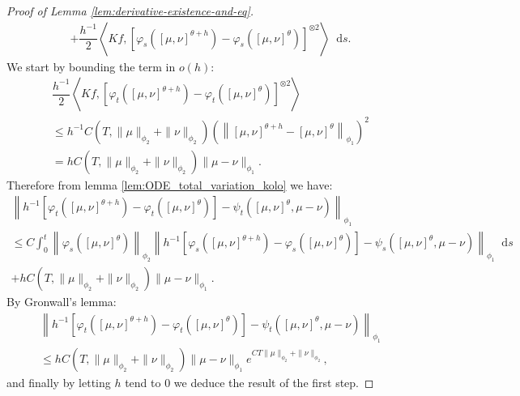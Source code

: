 \documentclass[11pt,a4paper]{article}
\newcommand{\brac}[1]{\left\langle#1\right\rangle}
\newcommand{\dd}{\mathop{}\!\mathrm{d}}
\begin{document}
\begin{proof}[Proof of Lemma \ref{lem:derivative-existence-and-eq}]
\begin{multline*}
        + \dfrac{h^{-1}}{2}\brac{Kf, \left[\varphi_s\left(\left[\mu,\nu \right]^{\theta+h} \right) - \varphi_s\left(\left[\mu,\nu \right]^{\theta} \right)\right]^{\otimes 2}} \dd s.
    \end{multline*}
    We start by bounding the term in $o(h)$:
    \begin{multline*}
        \dfrac{h^{-1}}{2}\brac{Kf, \left[\varphi_t\left(\left[\mu,\nu \right]^{\theta+h} \right) - \varphi_t\left(\left[\mu,\nu \right]^{\theta} \right)\right]^{\otimes 2}} \\
        \leq h^{-1}C\left(T,\|\mu\|_{\phi_2} + \|\nu\|_{\phi_2}\right)\left(\left\| \left[\mu,\nu \right]^{\theta+h} - \left[\mu,\nu \right]^{\theta}\right\|_{\phi_1}\right)^2\\
        = hC\left(T,\|\mu\|_{\phi_2} + \|\nu\|_{\phi_2}\right)\|\mu - \nu\|_{\phi_1}.
    \end{multline*}
    Therefore from lemma \ref{lem:ODE_total_variation_kolo} we have:
    \begin{multline*}
        \left\| h^{-1}\left[\varphi_t\left(\left[\mu,\nu \right]^{\theta+h} \right) - \varphi_t\left(\left[\mu,\nu \right]^{\theta} \right) \right] - \psi_t\left(\left[\mu,\nu \right]^\theta,\mu-\nu\right)\right\|_{\phi_1} \\
        \leq C\int_0^t \left\| \varphi_s\left(\left[\mu,\nu \right]^{\theta} \right) \right\|_{\phi_2}\left\| h^{-1}\left[\varphi_s\left(\left[\mu,\nu \right]^{\theta+h} \right) - \varphi_s\left(\left[\mu,\nu \right]^{\theta} \right) \right] - \psi_s\left(\left[\mu,\nu \right]^\theta,\mu-\nu\right)\right\|_{\phi_1} \dd s\\
        + hC\left(T,\|\mu\|_{\phi_2} + \|\nu\|_{\phi_2}\right)\|\mu - \nu\|_{\phi_1}.
    \end{multline*}
    By Gronwall's lemma:
    \begin{multline*}
        \left\| h^{-1}\left[\varphi_t\left(\left[\mu,\nu \right]^{\theta+h} \right) - \varphi_t\left(\left[\mu,\nu \right]^{\theta} \right) \right] - \psi_t\left(\left[\mu,\nu \right]^\theta,\mu-\nu\right)\right\|_{\phi_1} \\
        \leq hC\left(T,\|\mu\|_{\phi_2} + \|\nu\|_{\phi_2}\right)\|\mu - \nu\|_{\phi_1} e^{CT\|\mu\|_{\phi_2} + \|\nu\|_{\phi_2}},
    \end{multline*}
    and finally by letting $h$ tend to $0$ we deduce the result of the first step.
    

\end{proof}
\end{document}
